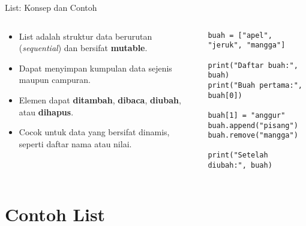 \documentclass[aspectratio=169, table]{beamer}
\begin{document}
\begin{frame}[fragile]{List: Konsep dan Contoh}
\vspace{20pt}

\begin{columns}[T]
  \begin{column}{0.48\textwidth}
    \begin{itemize}
      \item List adalah struktur data berurutan (\textit{sequential}) dan bersifat \textbf{mutable}.
      \item Dapat menyimpan kumpulan data sejenis maupun campuran.
      \item Elemen dapat \textbf{ditambah}, \textbf{dibaca}, \textbf{diubah}, atau \textbf{dihapus}.
      \item Cocok untuk data yang bersifat dinamis, seperti daftar nama atau nilai.
    \end{itemize}
  \end{column}

  \begin{column}{0.48\textwidth}
    \begin{lstlisting}[style=PythonStyle]
buah = ["apel", "jeruk", "mangga"]

print("Daftar buah:", buah)
print("Buah pertama:", buah[0])

buah[1] = "anggur"
buah.append("pisang")
buah.remove("mangga")

print("Setelah diubah:", buah)
    \end{lstlisting}
  \end{column}
\end{columns}

\end{frame}

\section{Contoh List}
\end{document}
